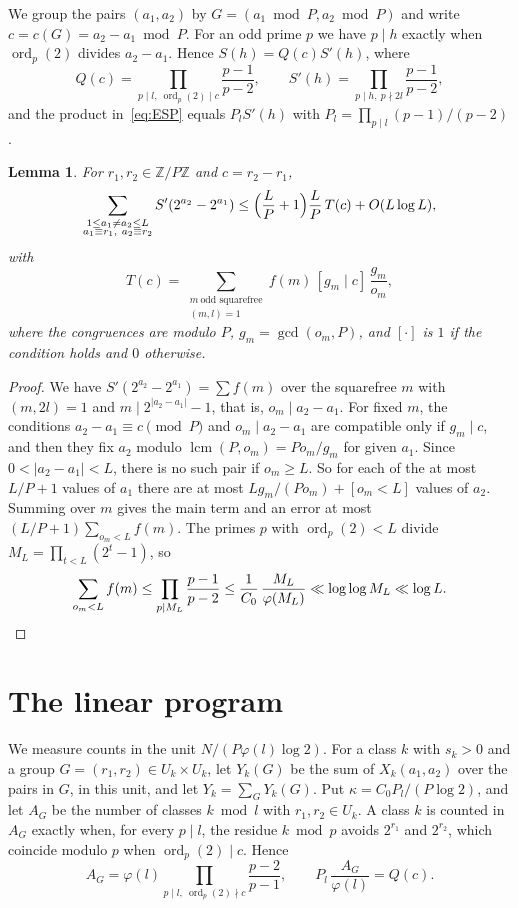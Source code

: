 \documentclass[11pt]{amsart}
\newtheorem{lemma}[theorem]{Lemma}
\theoremstyle{definition}
\theoremstyle{remark}
\numberwithin{equation}{section}
\newcommand{\ord}{\operatorname{ord}}
\newcommand{\lcm}{\operatorname{lcm}}
\begin{document}
We group the pairs $(a_1,a_2)$ by $G=(a_1\bmod P,a_2\bmod P)$ and write $c=c(G)=a_2-a_1\bmod P$. For an odd prime $p$ we have $p\mid h$ exactly when $\ord_p(2)$ divides $a_2-a_1$. Hence $S(h)=Q(c)S'(h)$, where
\[
Q(c)=\prod_{p\mid l,\ \ord_p(2)\mid c}\frac{p-1}{p-2},\qquad S'(h)=\prod_{p\mid h,\ p\nmid2l}\frac{p-1}{p-2},
\]
and the product in~\eqref{eq:ESP} equals $P_lS'(h)$ with $P_l=\prod_{p\mid l}(p-1)/(p-2)$.

\begin{lemma}\label{lem:mean}
For $r_1,r_2\in\mathbb Z/P\mathbb Z$ and $c=r_2-r_1$,
\[
\sum_{\substack{1\le a_1\ne a_2\le L\\a_1\equiv r_1,\ a_2\equiv r_2}}S'(2^{a_2}-2^{a_1})\le\Bigl(\frac LP+1\Bigr)\frac LP\,T(c)+O(L\log L),
\]
with
\[
T(c)=\sum_{\substack{m\ \text{odd squarefree}\\(m,l)=1}}f(m)\,[g_m\mid c]\,\frac{g_m}{o_m},
\]
where the congruences are modulo $P$, $g_m=\gcd(o_m,P)$, and $[\cdot]$ is $1$ if the condition holds and $0$ otherwise.
\end{lemma}

\begin{proof}
We have $S'(2^{a_2}-2^{a_1})=\sum f(m)$ over the squarefree $m$ with $(m,2l)=1$ and $m\mid2^{|a_2-a_1|}-1$, that is, $o_m\mid a_2-a_1$. For fixed $m$, the conditions $a_2-a_1\equiv c\pmod P$ and $o_m\mid a_2-a_1$ are compatible only if $g_m\mid c$, and then they fix $a_2$ modulo $\lcm(P,o_m)=Po_m/g_m$ for given $a_1$. Since $0<|a_2-a_1|<L$, there is no such pair if $o_m\ge L$. So for each of the at most $L/P+1$ values of $a_1$ there are at most $Lg_m/(Po_m)+[o_m<L]$ values of $a_2$. Summing over $m$ gives the main term and an error at most $(L/P+1)\sum_{o_m<L}f(m)$. The primes $p$ with $\ord_p(2)<L$ divide $M_L=\prod_{t<L}(2^t-1)$, so
\[
\sum_{o_m<L}f(m)\le\prod_{p\mid M_L}\frac{p-1}{p-2}\le\frac1{C_0}\,\frac{M_L}{\varphi(M_L)}\ll\log\log M_L\ll\log L.\qedhere
\]
\end{proof}

\section{The linear program}\label{sec:lp}

We measure counts in the unit $N/(P\varphi(l)\log2)$. For a class $k$ with $s_k>0$ and a group $G=(r_1,r_2)\in U_k\times U_k$, let $Y_k(G)$ be the sum of $X_k(a_1,a_2)$ over the pairs in $G$, in this unit, and let $Y_k=\sum_GY_k(G)$. Put $\kappa=C_0P_l/(P\log2)$, and let $A_G$ be the number of classes $k\bmod l$ with $r_1,r_2\in U_k$. A class $k$ is counted in $A_G$ exactly when, for every $p\mid l$, the residue $k\bmod p$ avoids $2^{r_1}$ and $2^{r_2}$, which coincide modulo $p$ when $\ord_p(2)\mid c$. Hence
\[
A_G=\varphi(l)\prod_{p\mid l,\ \ord_p(2)\nmid c}\frac{p-2}{p-1},\qquad P_l\,\frac{A_G}{\varphi(l)}=Q(c).
\]
\end{document}
